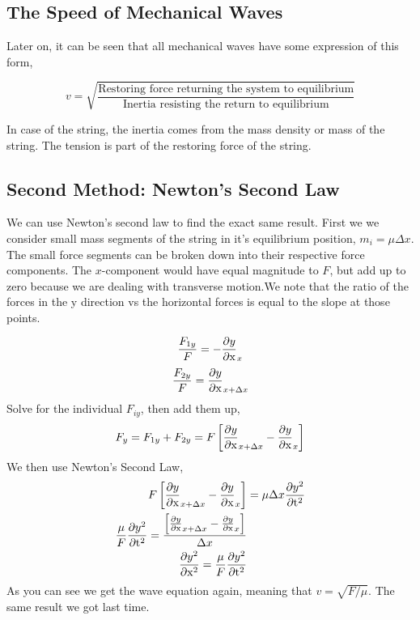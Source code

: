 \subsection{The Speed of Mechanical Waves}
Later on, it can be seen that all mechanical waves have some expression of this form, 

\begin{equation*}
	v = \sqrt{\frac{\text{Restoring force returning the system to equilibrium}}{\text{Inertia resisting the return to equilibrium}}}
\end{equation*}

In case of the string, the inertia comes from the mass density or mass of the string. The tension is part of the restoring force of the string.

\newpage
\subsection{Second Method: Newton's Second Law}
We can use Newton's second law to find the exact same result. First we we consider small mass segments of the string in it's equilibrium position, $m_i = \mu\Delta x$. The small force segments can be broken down into their respective force components. The $x$-component would have equal magnitude to $F$, but add up to zero because we are dealing with transverse motion.We note that the ratio of the forces in the y direction vs the horizontal forces is equal to the slope at those points. 

\begin{equation*}
	\frac{F_{1y}}{F} = -\frac{\partial y}{\partial\mathrm{x}}_{x}
\end{equation*}
\begin{equation*}
	\frac{F_{2y}}{F} = \frac{\partial y}{\partial\mathrm{x}}_{x+\Delta x}
\end{equation*}
Solve for the individual $F_{iy}$, then add them up,
\begin{equation*}
	F_y = F_{1y} + F_{2y} = F\left[ \frac{\partial y}{\partial\mathrm{x}}_{x+\Delta x} - \frac{\partial y}{\partial\mathrm{x}}_{x} \right]
\end{equation*}
We then use Newton's Second Law,
\begin{align*}
	F\left[ \frac{\partial y}{\partial\mathrm{x}}_{x+\Delta x} - \frac{\partial y}{\partial\mathrm{x}}_{x} \right] &= \mu \Delta x \frac{\partial y^{2}}{\partial\mathrm{t}^{2}} \\ 
	\frac{\mu}{F}\frac{\partial y^{2}}{\partial\mathrm{t}^{2}} = \frac{\left[ \frac{\partial y}{\partial\mathrm{x}}_{x+\Delta x} - \frac{\partial y}{\partial\mathrm{x}}_{x} \right]}{\Delta x} \\
	\frac{\partial y^{2}}{\partial\mathrm{x}^{2}} = \frac{\mu}{F}\frac{\partial y^{2}}{\partial\mathrm{t}^{2}}
\end{align*}
As you can see we get the wave equation again, meaning that $v = \sqrt{F/\mu}$. The same result we got last time.

